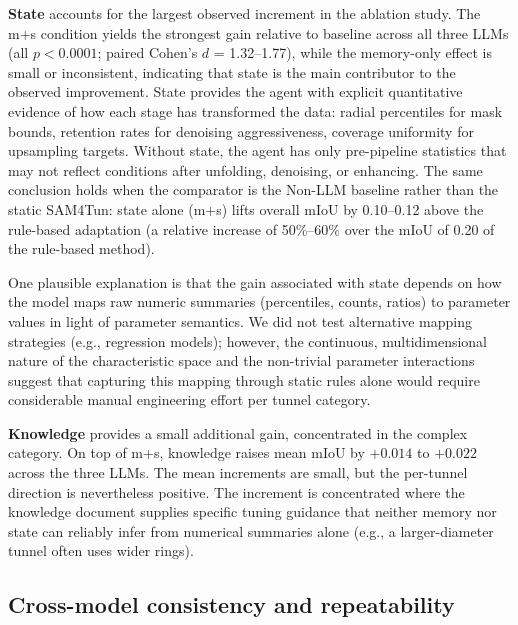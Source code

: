 \documentclass[a4paper,fleqn]{cas-dc}
\begin{document}
{\textbf{State} accounts for the largest observed increment in the ablation study. The m+s condition yields the strongest gain relative to baseline across all three LLMs (all $p < 0.0001$; paired Cohen's \mbox{$d$} = 1.32--1.77), while the memory-only effect is small or inconsistent, indicating that state is the main contributor to the observed improvement. State provides the agent with explicit quantitative evidence of how each stage has transformed the data: radial percentiles for mask bounds, retention rates for denoising aggressiveness, coverage uniformity for upsampling targets. Without state, the agent has only pre-pipeline statistics that may not reflect conditions after unfolding, denoising, or enhancing. The same conclusion holds when the comparator is the Non-LLM baseline rather than the static SAM4Tun: state alone (m+s) lifts overall mIoU by 0.10--0.12 above the rule-based adaptation (a relative increase of 50\%--60\% over the mIoU of 0.20 of the rule-based method).


One plausible explanation is that the gain associated with state depends on how the model maps raw numeric summaries (percentiles, counts, ratios) to parameter values in light of parameter semantics. We did not test alternative mapping strategies (e.g., regression models); however, the continuous, multidimensional nature of the characteristic space and the non-trivial parameter interactions suggest that capturing this mapping through static rules alone would require considerable manual engineering effort per tunnel category.

\textbf{Knowledge} provides a small additional gain, concentrated in the complex category. On top of m+s, knowledge raises mean mIoU by $+0.014$ to $+0.022$ across the three LLMs. The mean increments are small, but the per-tunnel direction is nevertheless positive. The increment is concentrated where the knowledge document supplies specific tuning guidance that neither memory nor state can reliably infer from numerical summaries alone (e.g.,  a larger-diameter tunnel often uses wider rings).


\subsection{Cross-model consistency and repeatability}\label{sec:consistency}

}
\end{document}
